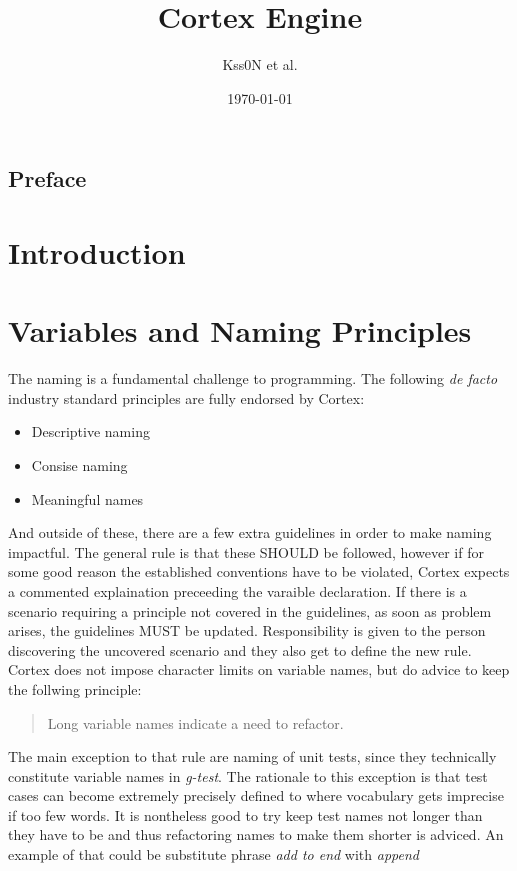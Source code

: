 \documentclass{report}
\title{Cortex Engine}
\author{Kss0N et al.}
\date{\today}
\begin{document}
\maketitle
\tableofcontents
\newpage

\section*{Preface}






\chapter{Introduction}



\chapter{Variables and Naming Principles}
The naming is a fundamental challenge to programming. 
The following \textit{de facto} industry standard principles are fully endorsed by Cortex:
\begin{itemize}
    \item Descriptive naming
    \item Consise naming
    \item Meaningful names
\end{itemize}
And outside of these, there are a few extra guidelines in order to make naming impactful.
The general rule is that these SHOULD be followed, however if for some good reason the established conventions have to be violated, Cortex expects a commented explaination preceeding the varaible declaration.
If there is a scenario requiring a principle not covered in the guidelines, as soon as problem arises, the guidelines MUST be updated.
Responsibility is given to the person discovering the uncovered scenario and they also get to define the new rule.
Cortex does not impose character limits on variable names, but do advice to keep the follwing principle:
\begin{quote}
    Long variable names indicate a need to refactor.
\end{quote}
The main exception to that rule are naming of unit tests, since they technically constitute variable names in \emph{g-test}.
The rationale to this exception is that test cases can become extremely precisely defined to where vocabulary gets imprecise if too few words.
It is nontheless good to try keep test names not longer than they have to be and thus refactoring names to make them shorter is adviced.
An example of that could be substitute phrase \emph{add to end} with \emph{append}
\end{document}
